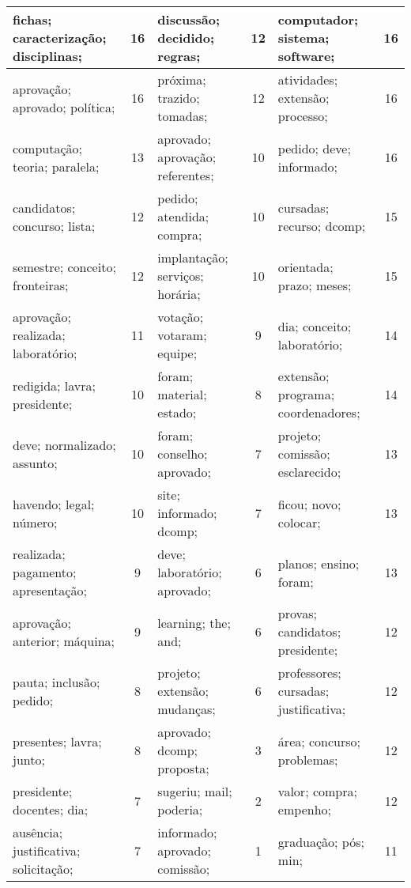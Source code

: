 \begin{table}[!h]
\begin{tabular}{|l|c||l|c||l|c|}
   fichas; caracterização; disciplinas; &   16  &         discussão; decidido; regras; &   12  &       computador; sistema; software; &   16  \\ \hline
   aprovação; aprovado; política; &   16  &         próxima; trazido; tomadas; &   12  &       atividades; extensão; processo; &   16  \\ \hline
   computação; teoria; paralela; &   13  &         aprovado; aprovação; referentes; &   10  &       pedido; deve; informado; &   16  \\ \hline
   candidatos; concurso; lista; &   12  &         pedido; atendida; compra; &   10  &       cursadas; recurso; dcomp; &   15  \\ \hline
   semestre; conceito; fronteiras; &   12  &         implantação; serviços; horária; &   10  &       orientada; prazo; meses; &   15  \\ \hline
   aprovação; realizada; laboratório; &   11  &         votação; votaram; equipe; &   9  &       dia; conceito; laboratório; &   14  \\ \hline
   redigida; lavra; presidente; &   10  &         foram; material; estado; &   8  &       extensão; programa; coordenadores; &   14  \\ \hline
   deve; normalizado; assunto; &   10  &         foram; conselho; aprovado; &   7  &       projeto; comissão; esclarecido; &   13  \\ \hline
   havendo; legal; número; &   10  &         site; informado; dcomp; &   7  &       ficou; novo; colocar; &   13  \\ \hline
   realizada; pagamento; apresentação; &   9  &         deve; laboratório; aprovado; &   6  &       planos; ensino; foram; &   13  \\ \hline
   aprovação; anterior; máquina; &   9  &         learning; the; and; &   6  &       provas; candidatos; presidente; &   12  \\ \hline
   pauta; inclusão; pedido; &   8  &         projeto; extensão; mudanças; &   6  &       professores; cursadas; justificativa; &   12  \\ \hline
   presentes; lavra; junto; &   8  &         aprovado; dcomp; proposta; &   3  &       área; concurso; problemas; &   12  \\ \hline
   presidente; docentes; dia; &   7  &         sugeriu; mail; poderia; &   2  &       valor; compra; empenho; &   12  \\ \hline
   ausência; justificativa; solicitação; &   7  &         informado; aprovado; comissão; &   1  &       graduação; pós; min; &   11  \\ \hline

\end{tabular}
\end{table}
